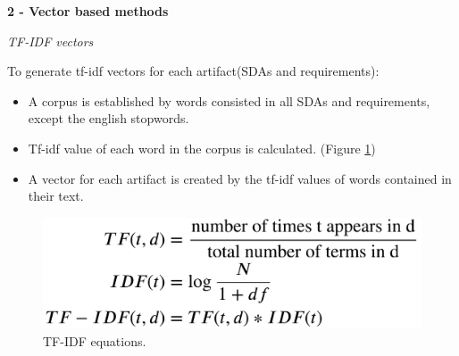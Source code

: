 \documentclass[conference]{IEEEtran}
\begin{document}


\textbf{2 - Vector based methods}

\textit{TF-IDF vectors}

To generate tf-idf vectors for each artifact(SDAs and requirements):

\begin{itemize}
    \item A corpus is established by words consisted in all SDAs and requirements, except the english stopwords.
    \item Tf-idf value of each word in the corpus is calculated. (Figure \ref{fig:tfidf})
    \item A vector for each artifact is created by the tf-idf values of words contained in their text.
\end{itemize}


\begin{figure}[htb]
    \centering
    \includegraphics[width=0.75\linewidth]{figs/tfidf.png}
    \caption{TF-IDF equations.}
    \label{fig:tfidf}
\end{figure}
\end{document}
